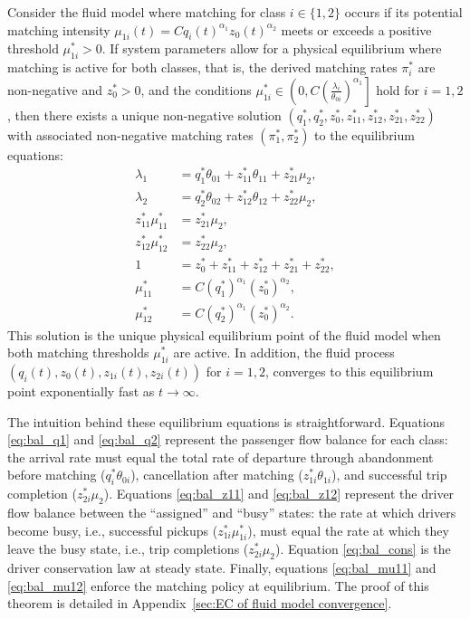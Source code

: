 \begin{theorem} \label{thm:equilibrium}
Consider the fluid model where matching for class $i \in \{1,2\}$ occurs
if its potential matching intensity $\mu_{1i}(t) = C q_i(t)^{\alpha_1} z_0(t)^{\alpha_2}$ meets
or exceeds a positive threshold $\mu_{1i}^* > 0$.
If system parameters allow for a physical equilibrium where matching is active
for both classes, that is, the derived matching rates $\pi_i^*$ are non-negative and $z_0^* > 0$, 
and the conditions $\mu_{1i}^* \in \left(0, C\left(\frac{\lambda_i}{\theta_{0i}}\right)^{\alpha_1}\right]$ 
hold for $i=1,2$,
then there exists a unique non-negative solution  
$(q_1^*, q_2^*, z_0^*, z_{11}^*, z_{12}^*, z_{21}^*, z_{22}^*)$ 
with associated non-negative matching rates $(\pi_1^*, \pi_2^*)$ to the equilibrium equations:
    \begin{align}
     \lambda_1 &= q_1^*\theta_{01} + z_{11}^*\theta_{11} + z_{21}^*\mu_2, \label{eq:bal_q1}\\
     \lambda_2 &= q_2^*\theta_{02} + z_{12}^*\theta_{12} + z_{22}^*\mu_2, \label{eq:bal_q2}\\
     z_{11}^*\mu_{11}^* &= z_{21}^*\mu_2, \label{eq:bal_z11}\\
     z_{12}^*\mu_{12}^* &= z_{22}^*\mu_2, \label{eq:bal_z12}\\
     1 &= z_0^* + z_{11}^* + z_{12}^* + z_{21}^* + z_{22}^*, \label{eq:bal_cons}\\
     \mu_{11}^* &= C (q_1^*)^{\alpha_1}(z_0^*)^{\alpha_2}, \label{eq:bal_mu11}\\
     \mu_{12}^* &= C (q_2^*)^{\alpha_1}(z_0^*)^{\alpha_2}. \label{eq:bal_mu12}
     \end{align}
This solution is the unique physical equilibrium point of the fluid model 
when both matching thresholds $\mu_{1i}^*$ are active. In addition,
the fluid process $(q_i(t), z_0(t), z_{1i}(t), z_{2i}(t))$ for $i=1,2$, 
converges to this equilibrium point exponentially fast as $t \to \infty$.
\end{theorem}

The intuition behind these equilibrium equations is straightforward. Equations 
\eqref{eq:bal_q1} and \eqref{eq:bal_q2} represent the passenger flow balance for each class: 
the arrival rate must equal the total rate of departure through abandonment before matching 
($q_i^*\theta_{0i}$), cancellation after matching ($z_{1i}^*\theta_{1i}$),
and successful trip completion ($z_{2i}^*\mu_2$). Equations \eqref{eq:bal_z11}
and \eqref{eq:bal_z12} represent the driver flow balance between the ``assigned'' and
``busy'' states: the rate at which drivers become busy, i.e., successful pickups ($z_{1i}^*\mu_{1i}^*$),
must equal the rate at which they leave the busy state, i.e., trip completions ($z_{2i}^*\mu_2$). 
Equation \eqref{eq:bal_cons} is the driver conservation law at steady state. Finally, equations 
\eqref{eq:bal_mu11} and \eqref{eq:bal_mu12} enforce the matching policy at equilibrium. 
The proof of this theorem is detailed in Appendix~\ref{sec:EC of fluid model convergence}.

